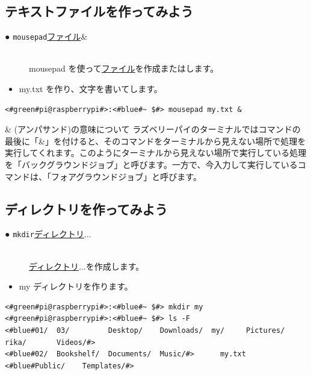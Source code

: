 \documentclass[text03.tex]{subfiles}
\begin{document}
\subsection{テキストファイルを作ってみよう}
\begin{description}
\item[● \texttt{mousepad}\textvisiblespace \underline{ファイル}\textvisiblespace \&]\mbox{}\\
mousepad を使って\underline{ファイル}を作成またはします。
\end{description}
\newpage
\begin{itemize}
\item[<例>]my.txt を作り、文字を書いてします。
\end{itemize}
\begin{lstlisting}[caption=mousepadの例, label=mousepad]
<#green#pi@raspberrypi#>:<#blue#~ $#> mousepad my.txt &
\end{lstlisting}

\begin{itembox}[c]{\& (アンパサンド)の意味について}
    ラズベリーパイのターミナルではコマンドの最後に「\&」を付けると、そのコマンドをターミナルから見えない場所で処理を実行してくれます。このようにターミナルから見えない場所で実行している処理を「バックグラウンドジョブ」と呼びます。一方で、今入力して実行しているコマンドは、「フォアグラウンドジョブ」と呼びます。
\end{itembox}

\subsection{ディレクトリを作ってみよう}
\begin{description}
\item[● \texttt{mkdir}\textvisiblespace \underline{ディレクトリ}$\ldots$]\mbox{}\\
\underline{ディレクトリ}$\ldots$を作成します。
\end{description}
\begin{itemize}
\item[<例>]my ディレクトリを作ります。
\end{itemize}
\begin{lstlisting}[caption=mkdirの例, label=mkdir]
<#green#pi@raspberrypi#>:<#blue#~ $#> mkdir my
<#green#pi@raspberrypi#>:<#blue#~ $#> ls -F
<#blue#01/  03/         Desktop/    Downloads/  my/     Pictures/  rika/       Videos/#>
<#blue#02/  Bookshelf/  Documents/  Music/#>      my.txt  <#blue#Public/    Templates/#>
\end{lstlisting}
\end{document}
